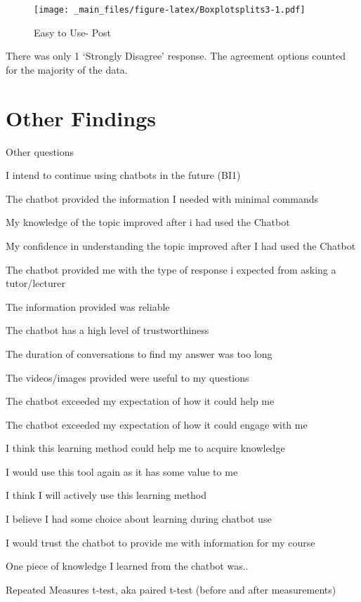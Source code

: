 \documentclass[a4paper, nobind]{templates/ociamthesis}
\begin{document}
\begin{figure}
\centering
\texttt{[image: \_main\_files/figure-latex/Boxplotsplits3-1.pdf]}
\caption{\label{fig:Boxplotsplits3}Easy to Use- Post}
\end{figure}

There was only 1 `Strongly Disagree' response. The agreement options
counted for the majority of the data.

\hypertarget{other-findings}{%
\section{Other Findings}\label{other-findings}}

Other questions

I intend to continue using chatbots in the future (BI1)

The chatbot provided the information I needed with minimal commands

My knowledge of the topic improved after i had used the Chatbot

My confidence in understanding the topic improved after I had used the
Chatbot

The chatbot provided me with the type of response i expected from asking
a tutor/lecturer

The information provided was reliable

The chatbot has a high level of trustworthiness

The duration of conversations to find my answer was too long

The videos/images provided were useful to my questions

The chatbot exceeded my expectation of how it could help me

The chatbot exceeded my expectation of how it could engage with me

I think this learning method could help me to acquire knowledge

I would use this tool again as it has some value to me

I think I will actively use this learning method

I believe I had some choice about learning during chatbot use

I would trust the chatbot to provide me with information for my course

One piece of knowledge I learned from the chatbot was..

Repeated Measures t-test, aka paired t-test (before and after
measurements)
\end{document}
